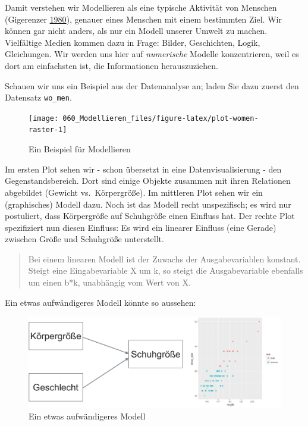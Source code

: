 \documentclass[12pt,]{book}
\begin{document}
Damit verstehen wir Modellieren als eine typische Aktivität von Menschen
(Gigerenzer \protect\hyperlink{ref-9783497008957}{1980}), genauer eines
Menschen mit einem bestimmten Ziel. Wir können gar nicht anders, als nur
ein Modell unserer Umwelt zu machen. Vielfältige Medien kommen dazu in
Frage: Bilder, Geschichten, Logik, Gleichungen. Wir werden uns hier auf
\emph{numerische} Modelle konzentrieren, weil es dort am einfachsten
ist, die Informationen herauszuziehen.

Schauen wir uns ein Beispiel aus der Datenanalyse an; laden Sie dazu
zuerst den Datensatz \texttt{wo\_men}.

\begin{figure}

{\centering \texttt{[image: 060\_Modellieren\_files/figure-latex/plot-women-raster-1]} 

}

\caption{Ein Beispiel für Modellieren}\label{fig:plot-women-raster}
\end{figure}

Im ersten Plot sehen wir - schon übersetzt in eine Datenvisualisierung -
den Gegenstandsbereich. Dort sind einige Objekte zusammen mit ihren
Relationen abgebildet (Gewicht vs.~Körpergröße). Im mittleren Plot sehen
wir ein (graphisches) Modell dazu. Noch ist das Modell recht
unspezifisch; es wird nur postuliert, dass Körpergröße auf Schuhgröße
einen Einfluss hat. Der rechte Plot spezifiziert nun diesen Einfluss: Es
wird ein linearer Einfluss (eine Gerade) zwischen Größe und Schuhgröße
unterstellt.

\begin{quote}
Bei einem linearen Modell ist der Zuwachs der Ausgabevariablen konstant.
Steigt eine Eingabevariable X um k, so steigt die Ausgabevariable
ebenfalls um einen b*k, unabhängig vom Wert von X.
\end{quote}

Ein etwas aufwändigeres Modell könnte so aussehen:

\begin{figure}

{\centering \includegraphics[width=0.7\linewidth]{images/Modellieren_Bsp2} 

}

\caption{Ein etwas aufwändigeres Modell}\label{fig:plot-modell-bsp2}
\end{figure}
\end{document}

